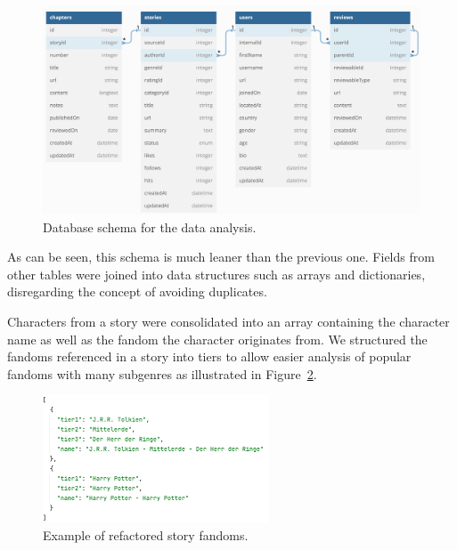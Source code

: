 \begin{figure}[htp]
    \centering
    \includegraphics[width=\textwidth]{figures/fan_fiction_db_analysis_comprehensive}
    \caption[Database schema for the data analysis.]{Database schema for the data analysis.}
    \label{fig:fan-fiction-db-analysis-comprehensive}
\end{figure}

As can be seen, this schema is much leaner than the previous one.
Fields from other tables were joined into data structures such as arrays and dictionaries, disregarding the concept of avoiding duplicates.

Characters from a story were consolidated into an array containing the character name as well as the fandom the character originates from.
We structured the fandoms referenced in a story into tiers to allow easier analysis of popular fandoms with many subgenres as illustrated in Figure~\ref{fig:refactor-fandom-example}.

\begin{figure}
    \centering
    \includegraphics[width=0.6\textwidth]{figures/refactor_fandom_example}
    \caption[Example of refactored story fandoms.]{Example of refactored story fandoms.}
    \label{fig:refactor-fandom-example}
\end{figure}

